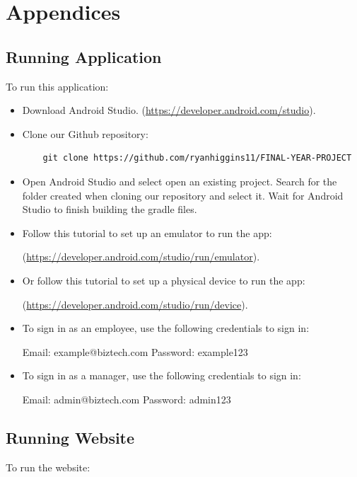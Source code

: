\chapter{Appendices}
\section{Running Application}
To run this application:

\begin{itemize}
    \item Download Android Studio. (\url{https://developer.android.com/studio}).
    \item Clone our Github repository:  
    \begin{verbatim}
    git clone https://github.com/ryanhiggins11/FINAL-YEAR-PROJECT
    \end{verbatim}
    \item Open Android Studio and select open an existing project. Search for the folder created when cloning our repository and select it. Wait for Android Studio to finish building the gradle files.
    \item Follow this tutorial to set up an emulator to run the app: 
    
    (\url{https://developer.android.com/studio/run/emulator}).
    \item Or follow this tutorial to set up a physical device to run the app: 
    
    (\url{https://developer.android.com/studio/run/device}).
    \item To sign in as an employee, use the following credentials to sign in:
    
    Email: example@biztech.com Password: example123
    \item To sign in as a manager, use the following credentials to sign in: 
    
    Email: admin@biztech.com Password: admin123
\end{itemize}


\section{Running Website}
To run the website:


